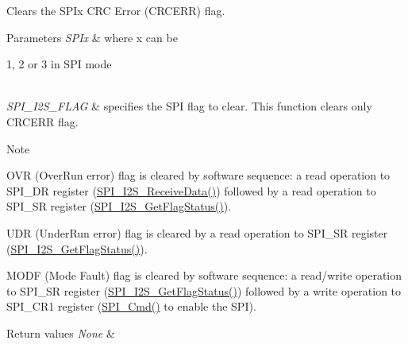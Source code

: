 Clears the S\+P\+Ix C\+RC Error (C\+R\+C\+E\+RR) flag. 


\begin{DoxyParams}{Parameters}
{\em S\+P\+Ix} & where x can be
\begin{DoxyItemize}
\item 1, 2 or 3 in S\+PI mode 
\end{DoxyItemize}\\
\hline
{\em S\+P\+I\+\_\+\+I2\+S\+\_\+\+F\+L\+AG} & specifies the S\+PI flag to clear. This function clears only C\+R\+C\+E\+RR flag. \\
\hline
\end{DoxyParams}
\begin{DoxyNote}{Note}

\begin{DoxyItemize}
\item O\+VR (Over\+Run error) flag is cleared by software sequence\+: a read operation to S\+P\+I\+\_\+\+DR register (\mbox{\hyperlink{group___s_p_i___private___functions_gab77de76547f3bff403236b263b070a30}{S\+P\+I\+\_\+\+I2\+S\+\_\+\+Receive\+Data()}}) followed by a read operation to S\+P\+I\+\_\+\+SR register (\mbox{\hyperlink{group___s_p_i___private___functions_ga1bd785d129e09c5734a876c8f2767204}{S\+P\+I\+\_\+\+I2\+S\+\_\+\+Get\+Flag\+Status()}}).
\item U\+DR (Under\+Run error) flag is cleared by a read operation to S\+P\+I\+\_\+\+SR register (\mbox{\hyperlink{group___s_p_i___private___functions_ga1bd785d129e09c5734a876c8f2767204}{S\+P\+I\+\_\+\+I2\+S\+\_\+\+Get\+Flag\+Status()}}).
\item M\+O\+DF (Mode Fault) flag is cleared by software sequence\+: a read/write operation to S\+P\+I\+\_\+\+SR register (\mbox{\hyperlink{group___s_p_i___private___functions_ga1bd785d129e09c5734a876c8f2767204}{S\+P\+I\+\_\+\+I2\+S\+\_\+\+Get\+Flag\+Status()}}) followed by a write operation to S\+P\+I\+\_\+\+C\+R1 register (\mbox{\hyperlink{group___s_p_i___private___functions_gaa31357879a65ee1ed7223f3b9114dcf3}{S\+P\+I\+\_\+\+Cmd()}} to enable the S\+PI). 
\end{DoxyItemize}
\end{DoxyNote}

\begin{DoxyRetVals}{Return values}
{\em None} & \\
\hline
\end{DoxyRetVals}
\mbox{\label{group___s_p_i___exported___functions_ga35a524a49ff3d058137060f751e8749f}} 
